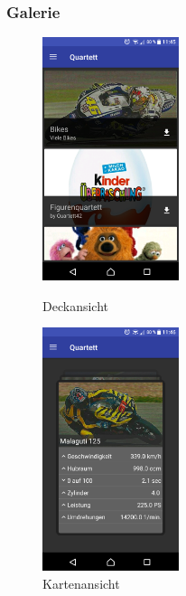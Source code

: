 \documentclass{scrartcl}
\begin{document}
\subsubsection{Galerie}

\begin{figure}[!ht]
  \centering
  \begin{minipage}{0.45\textwidth}
    \centering
    \includegraphics[width=4cm]{img/gallery_decks.png}
    \caption{Deckansicht}
  \end{minipage}
  \hfill
  \begin{minipage}{0.45\textwidth}
    \centering
    \includegraphics[width=4cm]{img/gallery_cards.png}
    \caption{Kartenansicht}
  \end{minipage}
\end{figure}
\end{document}
